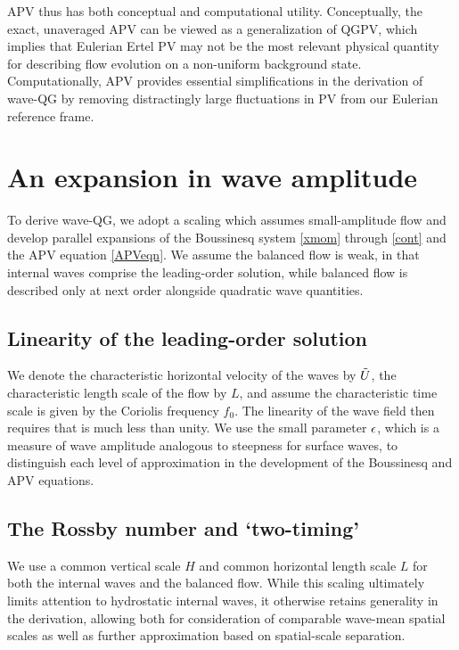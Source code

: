 \documentclass[12pt, oneside]{book}
\begin{document}
APV thus has both conceptual and computational utility.  Conceptually, the exact, unaveraged APV can be viewed as a generalization of QGPV, which implies that Eulerian Ertel PV may not be the most relevant physical quantity for describing flow evolution on a non-uniform background state.  Computationally, APV provides essential simplifications in the derivation of wave-QG by removing distractingly large fluctuations in PV from our Eulerian reference frame.  

\section{An expansion in wave amplitude}
\label{smallAmpSec}

To derive wave-QG, we adopt a scaling which assumes small-amplitude flow and develop parallel expansions of the Boussinesq system \eqref{xmom} through \eqref{cont} and the APV equation \eqref{APVeqn}.  We assume the balanced flow is weak, in that internal waves comprise the leading-order solution, while balanced flow is described only at next order alongside quadratic wave quantities.

\subsection{Linearity of the leading-order solution }
\label{linearSec}

We denote the characteristic horizontal velocity of the waves by $\tilde U$, the characteristic length scale of the flow  by $L$, and assume the characteristic time scale is given by the Coriolis frequency $f_0$.  The linearity of the wave field then requires that
\beq
\ep {} {} 
\label{epdef}
\eeq
is much less than unity.  We use the small parameter $\epsilon$, which is a measure of wave amplitude analogous to steepness for surface waves, to distinguish each level of approximation in the development of the Boussinesq and APV equations.  

\subsection{The Rossby number and `two-timing'}

We use a common vertical scale $H$ and common horizontal length scale $L$ for both the internal waves and the balanced flow.  While this scaling ultimately limits attention to hydrostatic internal waves, it otherwise retains generality in the derivation, allowing both for consideration of comparable wave-mean spatial scales as well as further approximation based on spatial-scale separation.
\end{document}
